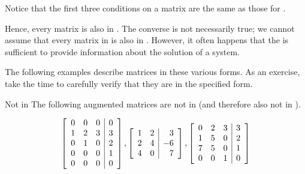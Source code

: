 Notice that the first three conditions on a \rref  \; matrix are the same as those for \ef. 


Hence, every \rref \;matrix is also in \ef. The converse is not necessarily true;
 we cannot assume that every matrix in \ef \;is also in \rref. However, it often happens
that the \ef \;is sufficient to provide information about the solution of a system.

The following examples describe matrices in these various forms. As an exercise, take the time
to carefully verify that they are in the specified form.

\begin{example}{Not in \EF}\label{exa:matricesnotechelon}
The following augmented matrices are not in \ef \;(and therefore also not in \rref).

\begin{equation*}
\left[
\begin{array}{rrr|r}
0 & 0 & 0 & 0 \\
1 & 2 & 3 & 3 \\
0 & 1 & 0 & 2 \\
0 & 0 & 0 & 1 \\
0 & 0 & 0 & 0
\end{array}
\right] ,\left[
\begin{array}{rr|r}
1 & 2 & 3 \\
2 & 4 & -6 \\
4 & 0 & 7
\end{array}
\right] ,\left[
\begin{array}{rrr|r}
0 & 2 & 3 & 3 \\
1 & 5 & 0 & 2 \\
7 & 5 & 0 & 1 \\
0 & 0 & 1 & 0
\end{array}
\right] 
\end{equation*}
\end{example}

